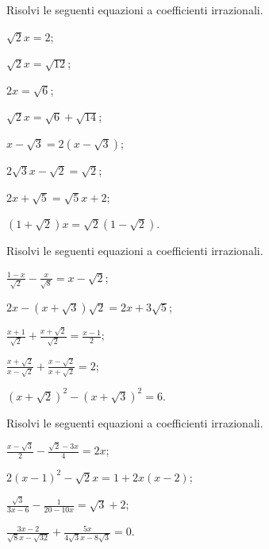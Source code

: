 \begin{esercizio}[\Ast]
 \label{ese:2.80}
Risolvi le seguenti equazioni a coefficienti irrazionali.
 \begin{multicols}{2}
 \begin{enumeratea}
 \item $\sqrt 2x=2$;
 \item $\sqrt 2x=\sqrt{12}$;
 \item $2x=\sqrt 6$;
 \item $\sqrt 2x=\sqrt 6+\sqrt{14}$;
 \item $x-\sqrt 3=2\left(x-\sqrt 3\right)$;
 \item $2\sqrt 3x-\sqrt 2=\sqrt 2$;
 \item $2x+\sqrt 5=\sqrt 5x+2$;
 \item $(1+\sqrt 2)x=\sqrt 2(1-\sqrt 2)$.
 \end{enumeratea}
 \end{multicols}
\end{esercizio}

\begin{esercizio}[\Ast]
 \label{ese:2.81}
Risolvi le seguenti equazioni a coefficienti irrazionali.
 \begin{multicols}{2}
 \begin{enumeratea}
 \item $\frac{1-x}{\sqrt 2}-\frac x{\sqrt 8}=x-\sqrt 2$;
 \item $2x-\left(x+\sqrt 3\right)\sqrt 2=2x+3\sqrt 5$;
 \item $\frac{x+1}{\sqrt 2}+\frac{x+\sqrt 2}{\sqrt 2}=\frac{x-1} 2$;
 \item $\frac{x+\sqrt 2}{x-\sqrt 2}+\frac{x-\sqrt 2}{x+\sqrt 2}=2$;
 \item $(x+\sqrt 2)^2-(x+\sqrt 3)^2=6$.
 \end{enumeratea}
 \end{multicols}
\end{esercizio}

\begin{esercizio}[\Ast]
 \label{ese:2.82}
Risolvi le seguenti equazioni a coefficienti irrazionali.
 \begin{multicols}{2}
 \begin{enumeratea}
 \item $\frac{x-\sqrt 3} 2-\frac{\sqrt 2-3x} 4=2x$;
 \item $2(x-1)^2-\sqrt 2x=1+2x(x-2)$;
 \item $\frac{\sqrt 3}{3x-6}-\frac 1{20-10x}=\sqrt 3+2$;
 \item $\frac{3x-2}{\sqrt 8x-\sqrt{32}}+\frac{5x}{4\sqrt 3x-8\sqrt 3}=0$.
 \end{enumeratea}
 \end{multicols}
\end{esercizio}

